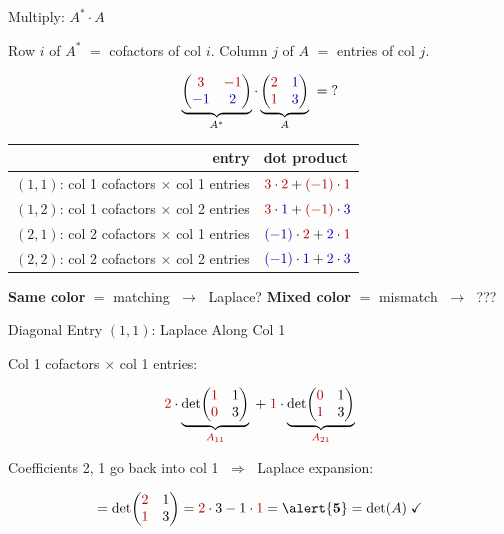 \documentclass[10pt]{beamer}
\theoremstyle{definition}
\newcommand{\x}[1]{\alert{\textbf{#1}}}
\newcommand{\rd}[1]{{\color{red!70!black}#1}}
\newcommand{\bl}[1]{{\color{blue!70!black}#1}}
\begin{document}
\begin{frame}{Multiply: $A^* \cdot A$}

Row $i$ of $A^*$ $=$ cofactors of col $i$. \quad Column $j$ of $A$ $=$ entries of col $j$.

\vfill

$$\underbrace{\begin{pmatrix} \rd{3} & \rd{-1} \\ \bl{-1} & \bl{2} \end{pmatrix}}_{A^*}
\cdot
\underbrace{\begin{pmatrix} \rd{2} & \bl{1} \\ \rd{1} & \bl{3} \end{pmatrix}}_{A}
\;=\; ?$$

\vfill

{\small
\renewcommand{\arraystretch}{1.6}
\begin{tabular}{r|l}
entry & dot product \\ \hline
$(1,1)$: \rd{col 1} cofactors $\times$ \rd{col 1} entries
  & $\rd{3}\cdot\rd{2} + \rd{({-}1)}\cdot\rd{1}$ \\
$(1,2)$: \rd{col 1} cofactors $\times$ \bl{col 2} entries
  & $\rd{3}\cdot\bl{1} + \rd{({-}1)}\cdot\bl{3}$ \\
$(2,1)$: \bl{col 2} cofactors $\times$ \rd{col 1} entries
  & $\bl{({-}1)}\cdot\rd{2} + \bl{2}\cdot\rd{1}$ \\
$(2,2)$: \bl{col 2} cofactors $\times$ \bl{col 2} entries
  & $\bl{({-}1)}\cdot\bl{1} + \bl{2}\cdot\bl{3}$
\end{tabular}
}

\vfill

\x{Same color} $=$ matching $\;\to\;$ Laplace? \qquad \x{Mixed color} $=$ mismatch $\;\to\;$ ???

\end{frame}


\begin{frame}{Diagonal Entry $(1,1)$: Laplace Along \rd{Col 1}}

\rd{Col 1} cofactors $\times$ \rd{col 1} entries:

$$\rd{2}\cdot\underbrace{\det\!\begin{pmatrix}\rd{1}&1\\\rd{0}&3\end{pmatrix}}_{\rd{A_{11}}}
\;+\;
\rd{1}\cdot\underbrace{\det\!\begin{pmatrix}\rd{0}&1\\\rd{1}&3\end{pmatrix}}_{\rd{A_{21}}}$$

\vfill

Coefficients \rd{2}, \rd{1} go back into \rd{col 1} $\;\Longrightarrow\;$ Laplace expansion:

$$= \det\!\begin{pmatrix}\rd{2}&1\\\rd{1}&3\end{pmatrix}
= \rd{2}\cdot 3 - 1 \cdot \rd{1} = \x{5} = \det(A) \;\checkmark$$

\end{frame}
\end{document}
